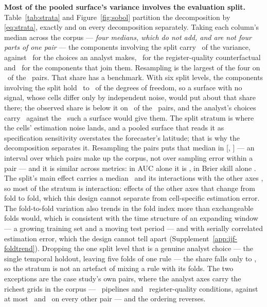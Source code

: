 \documentclass[11pt,3p,review,authoryear]{elsarticle}
\theoremstyle{definition}
\begin{document}
\textbf{Most of the pooled surface's variance involves the evaluation
split.} Table~\ref{tab:strata} and Figure~\ref{fig:sobol} partition the
decomposition by \eqref{eq:strata}, exactly and on every decomposition separately. Taking each
column's median across the corpus --- \emph{four medians, which do not add,
and are not four parts of one pair} --- the components involving the split
carry \shareResamplingStratumPct\ of the variance, against
\shareAnalystStratumPct\ for the choices an analyst makes,
\shareCounterfactualStratumPct\ for the register-quality counterfactual and
\shareMixedStratumPct\ for the components that join them. Resampling is the
largest of the four on \nResamplingLargest\ of the \nPairs\ pairs.
That share has a benchmark. With six split levels, the components involving
the split hold \splitNullShareMinPct\ to \splitNullShareMaxPct\ of the
degrees of freedom, so a surface with no signal, whose cells differ only by
independent noise, would put about that share there; the observed share is
below it on \nPairsSplitBelowNull\ of the \nPairs\ pairs, and the analyst's
choices carry \shareAnalystStratumPct\ against the \analystNullSharePct\ such
a surface would give them. The split stratum is where the cells' estimation
noise lands, and a pooled surface that reads it as specification sensitivity
overstates the forecaster's latitude; that is why the decomposition
separates it.
Resampling the pairs puts that median in
[\shareResamplingStratumLoPct, \shareResamplingStratumHiPct] --- an interval
over which pairs make up the corpus, not over sampling error within a pair ---
and it is similar across metrics: in AUC alone it is \splitShareAucPct, in
Brier skill alone \splitShareBrierPct. The split's main effect carries a median
\splitMainPct\ and its interactions with the other axes \splitInteractionsPct,
so most of the stratum is interaction: effects of the other axes that change
from fold to fold, which this design cannot separate from cell-specific
estimation error. The fold-to-fold variation also trends in the fold index
more than exchangeable folds would, which is consistent with the time
structure of an expanding window --- a growing training set and a moving test
period --- and with serially correlated estimation error, which the design
cannot tell apart (Supplement~\ref{app:ijf-foldtrend}). Dropping
the one split level that is a genuine analyst choice --- the single temporal
holdout, leaving five folds of one rule --- the share falls only to
\shareResamplingRollingPct, so the stratum is not an artefact of mixing a
rule with its folds. The two exceptions are the case study's own pairs, where
the analyst axes carry the richest grids in the corpus ---
\nPipelineLevelsCase\ pipelines and \nQualityFigOne\ register-quality
conditions, against at most \nPipelineLevelsLarge\ and \nQualityLevelsOther\
on every other pair --- and the ordering reverses.
\end{document}
